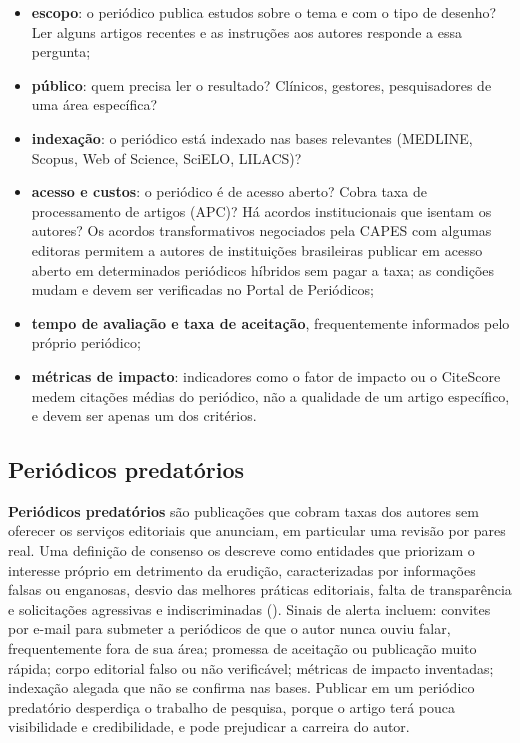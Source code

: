 \documentclass[
]{book}
\providecommand{\tightlist}{%
  \setlength{\itemsep}{0pt}\setlength{\parskip}{0pt}}
\begin{document}
\begin{itemize}
\tightlist
\item
  \textbf{escopo}: o periódico publica estudos sobre o tema e com o tipo de desenho? Ler alguns artigos recentes e as instruções aos autores responde a essa pergunta;
\item
  \textbf{público}: quem precisa ler o resultado? Clínicos, gestores, pesquisadores de uma área específica?
\item
  \textbf{indexação}: o periódico está indexado nas bases relevantes (MEDLINE, Scopus, Web of Science, SciELO, LILACS)?
\item
  \textbf{acesso e custos}: o periódico é de acesso aberto? Cobra taxa de processamento de artigos (APC)? Há acordos institucionais que isentam os autores? Os acordos transformativos negociados pela CAPES com algumas editoras permitem a autores de instituições brasileiras publicar em acesso aberto em determinados periódicos híbridos sem pagar a taxa; as condições mudam e devem ser verificadas no Portal de Periódicos;
\item
  \textbf{tempo de avaliação e taxa de aceitação}, frequentemente informados pelo próprio periódico;
\item
  \textbf{métricas de impacto}: indicadores como o fator de impacto ou o CiteScore medem citações médias do periódico, não a qualidade de um artigo específico, e devem ser apenas um dos critérios.
\end{itemize}

\subsection{Periódicos predatórios}\label{periuxf3dicos-predatuxf3rios}

\textbf{Periódicos predatórios} são publicações que cobram taxas dos autores sem oferecer os serviços editoriais que anunciam, em particular uma revisão por pares real. Uma definição de consenso os descreve como entidades que priorizam o interesse próprio em detrimento da erudição, caracterizadas por informações falsas ou enganosas, desvio das melhores práticas editoriais, falta de transparência e solicitações agressivas e indiscriminadas (). Sinais de alerta incluem: convites por e-mail para submeter a periódicos de que o autor nunca ouviu falar, frequentemente fora de sua área; promessa de aceitação ou publicação muito rápida; corpo editorial falso ou não verificável; métricas de impacto inventadas; indexação alegada que não se confirma nas bases. Publicar em um periódico predatório desperdiça o trabalho de pesquisa, porque o artigo terá pouca visibilidade e credibilidade, e pode prejudicar a carreira do autor.
\end{document}
